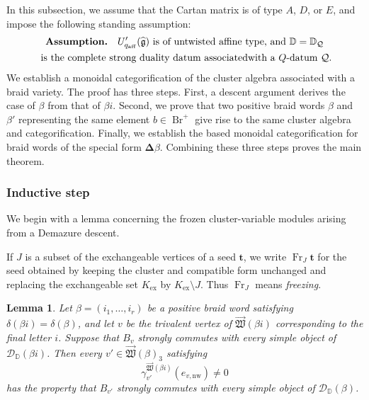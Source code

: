 \documentclass[12pt, reqno]{amsart}
\theoremstyle{plain}
\newtheorem{lemma}[theorem]{Lemma}
\theoremstyle{definition}
\numberwithin{equation}{section}
\newcommand{\DD}{\mathbb{D}}
\newcommand{\qaff}{q_{\mathrm{aff}}}
\newcommand{\fg}{\operatorname{\mathfrak{g}}}
\begin{document}
In this subsection, we assume that the Cartan matrix is of type
\(A\), \(D\), or \(E\), and impose the following standing assumption:
\begin{equation}\label{assumption}
\begin{gathered}
\text{\bfseries Assumption.}\quad
\text{\(U_{\qaff}'(\widehat{\fg})\) is of untwisted affine type,}
\text{ and }\DD=\DD_{\mathcal Q}\\
\text{ is the complete strong duality datum associated}
\text{with a }Q\text{-datum }\mathcal Q.
\end{gathered}
\end{equation}
We establish a monoidal categorification of the cluster algebra
associated with a braid variety. The proof has three steps.
First, a descent argument derives the case of \(\beta\) from that of
\(\beta i\). Second, we prove that two positive braid words
\(\beta\) and \(\beta'\) representing the same element
\(b\in\operatorname{Br}^{+}\) give rise to the same cluster algebra
and categorification. Finally, we establish the based monoidal
categorification for braid words of the special form
\(\boldsymbol{\Delta}\beta\). Combining these three steps proves the
main theorem.

\subsubsection{Inductive step}
We begin with a
lemma concerning the frozen cluster-variable modules arising from a
Demazure descent.

If \(J\) is a subset of the exchangeable vertices of a seed \(\mathbf t\),
we write \(\operatorname{Fr}_J\mathbf t\) for the seed obtained by keeping
the cluster and compatible form unchanged and replacing the exchangeable
set \(K_{\mathrm{ex}}\) by \(K_{\mathrm{ex}}\setminus J\). Thus
\(\operatorname{Fr}_J\) means \emph{freezing}.

\begin{lemma}\label{lem:commuting-factors-last-vertex}
Let \(\beta=(i_1,\ldots,i_r)\) be a positive braid word satisfying
\(\delta(\beta i)=\delta(\beta)\), and let \(v\) be the trivalent
vertex of \(\overrightarrow{\mathfrak W}(\beta i)\) corresponding to
the final letter \(i\). Suppose that \(B_v\) strongly commutes with
every simple object of \(\mathscr D_{\DD}(\beta i)\). Then every
\(v'\in\overrightarrow{\mathfrak W}(\beta)_3\) satisfying
\[
    \gamma_{v'}^{\overrightarrow{\mathfrak W}(\beta i)}
    (e_{v,\mathrm{nw}})\neq0
\]
has the property that \(B_{v'}\) strongly commutes with every simple
object of \(\mathscr D_{\DD}(\beta)\).
\end{lemma}
\end{document}
